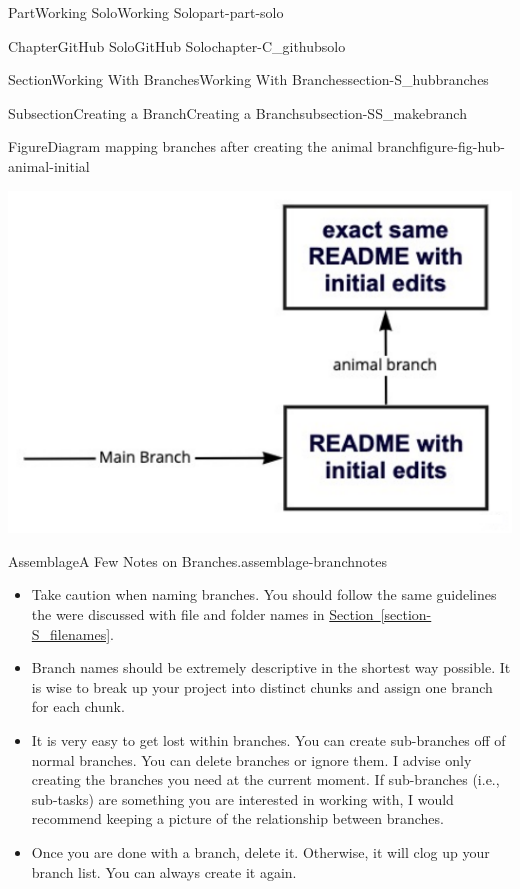 \documentclass[oneside,10pt,]{book}
\newcommand{\xreffont}{\relax}
\begin{document}
\begin{partptx}{Part}{Working Solo}{}{Working Solo}{}{}{part-part-solo}
\begin{chapterptx}{Chapter}{GitHub Solo}{}{GitHub Solo}{}{}{chapter-C_githubsolo}
\begin{sectionptx}{Section}{Working With Branches}{}{Working With Branches}{}{}{section-S_hubbranches}
\begin{subsectionptx}{Subsection}{Creating a Branch}{}{Creating a Branch}{}{}{subsection-SS_makebranch}
\begin{figureptx}{Figure}{Diagram mapping branches after creating the animal branch}{figure-fig-hub-animal-initial}{}
\begin{image}{0.15}{0.7}{0.15}{}
\includegraphics[width=\linewidth]{external/hub_animal_initial.pdf}
\end{image}%
\tcblower
\end{figureptx}%
\begin{assemblage}{Assemblage}{A Few Notes on Branches.}{assemblage-branchnotes}%
%
\begin{itemize}[label=\textbullet]
\item{}Take caution when naming branches. You should follow the same guidelines the were discussed with file and folder names in \hyperref[section-S_filenames]{Section~{\xreffont\ref{section-S_filenames}}}.%
\item{}Branch names should be extremely descriptive in the shortest way possible. It is wise to break up your project into distinct chunks and assign one branch for each chunk.%
\item{}It is very easy to get lost within branches. You can create sub-branches off of normal branches. You can delete branches or ignore them. I advise only creating the branches you need at the current moment. If sub-branches (i.e., sub-tasks) are something you are interested in working with, I would recommend keeping a picture of the relationship between branches.%
\item{}Once you are done with a branch, delete it. Otherwise, it will clog up your branch list. You can always create it again.%
\end{itemize}
%
\end{assemblage}
\end{subsectionptx}
%
%
\typeout{************************************************}
\typeout{************************************************}

\end{sectionptx}
\end{chapterptx}
\end{partptx}
\end{document}
